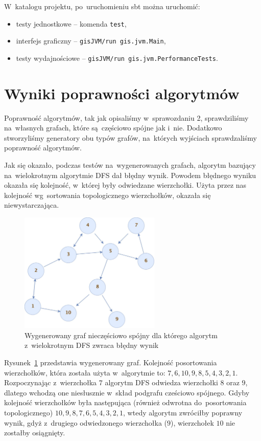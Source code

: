 \documentclass[a4paper,12pt]{mwart}
\begin{document}
W~katalogu projektu, po~uruchomieniu sbt można uruchomić:
\begin{itemize}
\item testy jednostkowe -- komenda \verb+test+,
\item interfejs graficzny -- \verb+gisJVM/run gis.jvm.Main+,
\item testy wydajnościowe -- \verb+gisJVM/run gis.jvm.PerformanceTests+.
\end{itemize}

\section{Wyniki poprawności algorytmów}

Poprawność algorytmów, tak jak opisaliśmy w~sprawozdaniu 2, sprawdziliśmy
na~własnych grafach, które są~częściowo spójne jak i~nie. Dodatkowo
stworzyliśmy generatory obu typów grafów, na~których wyjściach sprawdzaliśmy
poprawność algorytmów.

Jak się okazało, podczas testów na~wygenerowanych grafach, algorytm bazujący
na~wielokrotnym algorytmie DFS dał błędny wynik. Powodem błędnego wyniku
okazała się kolejność, w~której były odwiedzane wierzchołki. Użyta przez nas
kolejność wg~sortowania topologicznego wierzchołków, okazała się
niewystarczająca.

\begin{figure}[htpb]
\centering
\includegraphics[width=0.6\textwidth]{generated-tricky-graph.jpg}
\caption{Wygenerowany graf nieczęściowo spójny dla którego algorytm
  z~wielokrotnym DFS zwraca błędny wynik}
\label{fig:tricky-graph}
\end{figure}

Rysunek~\ref{fig:tricky-graph} przedstawia wygenerowany graf. Kolejność
posortowania wierzchołków, która została użyta w~algorytmie to:
$7, 6, 10, 9, 8, 5, 4, 3, 2, 1$. Rozpoczynając z~wierzchołka $7$ algorytm DFS
odwiedza wierzchołki $8$ oraz $9$, dlatego wchodzą one niesłusznie w~skład
podgrafu cześciowo spójnego. Gdyby kolejność wierzchołków była następująca
(również odwrotna do~posortowania topologicznego)
$10, 9, 8, 7, 6, 5, 4, 3, 2, 1$, wtedy algorytm zwróciłby poprawny wynik, gdyż
z~drugiego odwiedzonego wierzchołka ($9$), wierzchołek $10$ nie zostałby
osiągnięty.
\end{document}
